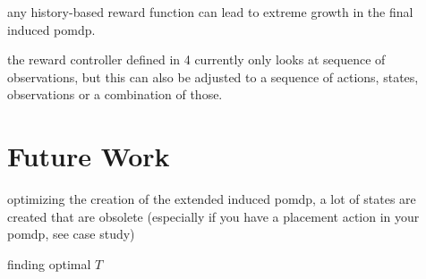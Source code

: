 
any history-based reward function can lead to extreme growth in the final induced pomdp. 

the reward controller defined in 4 currently only looks at sequence of observations, but this can also be adjusted to a sequence of actions, states, observations or a combination of those. 

\section{Future Work}

optimizing the creation of the extended induced pomdp, a lot of states are created that are obsolete (especially if you have a placement action in your pomdp, see case study)


finding optimal $T$